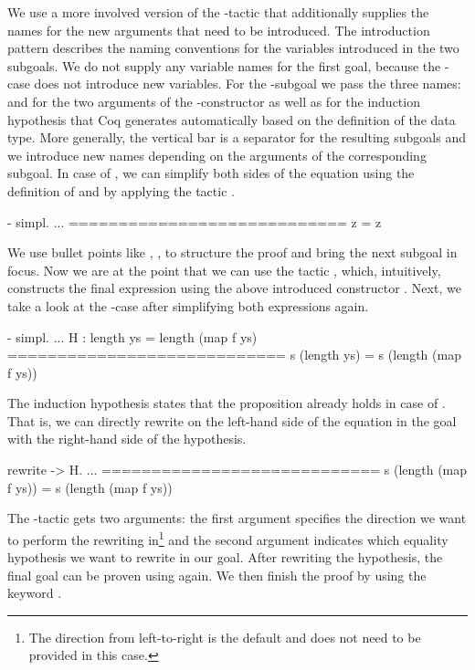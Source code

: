 We use a more involved version of the -tactic that additionally supplies the names for the new arguments that need to be introduced.
The introduction pattern \cinl{[ | y ys H ]} describes the naming conventions for the variables introduced in the two subgoals.
We do not supply any variable names for the first goal, because the -case does not introduce new variables.
For the -subgoal we pass the three names:  and  for the two arguments of the -constructor as well as  for the induction hypothesis that Coq generates automatically based on the definition of the  data type.
More generally, the vertical bar is a separator for the resulting subgoals and we introduce new names depending on the arguments of the corresponding subgoal.
In case of , we can simplify both sides of the equation using the definition of  and  by applying the tactic .

\begin{cproof}{- simpl.}
  ...
  ============================
  z = z
\end{cproof}

We use bullet points like \cinl{-}, \cinl{+}, \cinl{*} to structure the proof and bring the next subgoal in focus.
Now we are at the point that we can use the tactic , which, intuitively, constructs the final expression using the above introduced constructor .
Next, we take a look at the -case after simplifying both expressions again.

\begin{cproof}{- simpl.}
  ...
  H : length ys = length (map f ys)
  ============================
  s (length ys) = s (length (map f ys))
\end{cproof}

The induction hypothesis  states that the proposition already holds in case of .
That is, we can directly rewrite  on the left-hand side of the equation in the goal with the right-hand side of the hypothesis.

\begin{cproof}{rewrite -> H.}
  ...
  ============================
  s (length (map f ys)) =
  s (length (map f ys))
\end{cproof}

The -tactic gets two arguments: the first argument specifies the direction we want to perform the rewriting in\footnote{The direction from left-to-right is the default and does not need to be provided in this case.} and the second argument indicates which equality hypothesis we want to rewrite in our goal.
After rewriting the hypothesis, the final goal can be proven using  again.
We then finish the proof by using the keyword .

